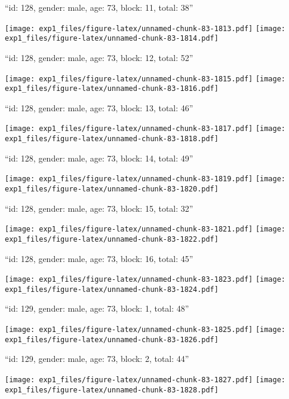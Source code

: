 \documentclass[11pt,,]{article}
\begin{document}
\newpage
[1] 

``id: 128, gender: male, age: 73, block: 11, total: 38''

\texttt{[image: exp1\_files/figure-latex/unnamed-chunk-83-1813.pdf]}
\texttt{[image: exp1\_files/figure-latex/unnamed-chunk-83-1814.pdf]}

\newpage
[1] 

``id: 128, gender: male, age: 73, block: 12, total: 52''

\texttt{[image: exp1\_files/figure-latex/unnamed-chunk-83-1815.pdf]}
\texttt{[image: exp1\_files/figure-latex/unnamed-chunk-83-1816.pdf]}

\newpage
[1] 

``id: 128, gender: male, age: 73, block: 13, total: 46''

\texttt{[image: exp1\_files/figure-latex/unnamed-chunk-83-1817.pdf]}
\texttt{[image: exp1\_files/figure-latex/unnamed-chunk-83-1818.pdf]}

\newpage
[1] 

``id: 128, gender: male, age: 73, block: 14, total: 49''

\texttt{[image: exp1\_files/figure-latex/unnamed-chunk-83-1819.pdf]}
\texttt{[image: exp1\_files/figure-latex/unnamed-chunk-83-1820.pdf]}

\newpage
[1] 

``id: 128, gender: male, age: 73, block: 15, total: 32''

\texttt{[image: exp1\_files/figure-latex/unnamed-chunk-83-1821.pdf]}
\texttt{[image: exp1\_files/figure-latex/unnamed-chunk-83-1822.pdf]}

\newpage
[1] 

``id: 128, gender: male, age: 73, block: 16, total: 45''

\texttt{[image: exp1\_files/figure-latex/unnamed-chunk-83-1823.pdf]}
\texttt{[image: exp1\_files/figure-latex/unnamed-chunk-83-1824.pdf]}

\newpage
[1] 

``id: 129, gender: male, age: 73, block: 1, total: 48''

\texttt{[image: exp1\_files/figure-latex/unnamed-chunk-83-1825.pdf]}
\texttt{[image: exp1\_files/figure-latex/unnamed-chunk-83-1826.pdf]}

\newpage
[1] 

``id: 129, gender: male, age: 73, block: 2, total: 44''

\texttt{[image: exp1\_files/figure-latex/unnamed-chunk-83-1827.pdf]}
\texttt{[image: exp1\_files/figure-latex/unnamed-chunk-83-1828.pdf]}
\end{document}
